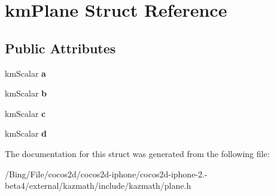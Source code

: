 \hypertarget{structkm_plane}{\section{km\-Plane Struct Reference}
\label{structkm_plane}
}
\subsection*{Public Attributes}
\begin{DoxyCompactItemize}
\item 
\hypertarget{structkm_plane_a912b0822bfd525570a072d01b0c3b9e1}{km\-Scalar {\bfseries a}}\label{structkm_plane_a912b0822bfd525570a072d01b0c3b9e1}

\item 
\hypertarget{structkm_plane_ac16b759b0f6973f00c2c742ec418e2d1}{km\-Scalar {\bfseries b}}\label{structkm_plane_ac16b759b0f6973f00c2c742ec418e2d1}

\item 
\hypertarget{structkm_plane_a46fb82aee3e4ccec7bb027ba53998600}{km\-Scalar {\bfseries c}}\label{structkm_plane_a46fb82aee3e4ccec7bb027ba53998600}

\item 
\hypertarget{structkm_plane_aa3c74528242125229ab0038e9a09b803}{km\-Scalar {\bfseries d}}\label{structkm_plane_aa3c74528242125229ab0038e9a09b803}

\end{DoxyCompactItemize}


The documentation for this struct was generated from the following file\-:\begin{DoxyCompactItemize}
\item 
/\-Bing/\-File/cocos2d/cocos2d-\/iphone/cocos2d-\/iphone-\/2.-\/beta4/external/kazmath/include/kazmath/plane.\-h\end{DoxyCompactItemize}
